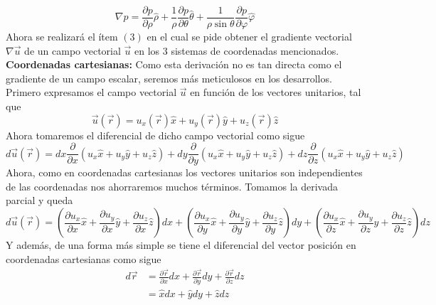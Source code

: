 \documentclass[11pt,letterpaper]{article}
\begin{document}
\begin{equation}
    \nabla p = \frac{\partial p}{\partial \rho}\hat{\rho} + \frac{1}{\rho}\frac{\partial p }{\partial \theta}\hat{\theta}+\frac{1}{\rho\sin{\theta}}\frac{\partial p }{\partial \varphi}\hat{\varphi}
\end{equation}
Ahora se realizará el ítem $(3)$ en el cual se pide obtener el gradiente vectorial $\nabla \vec{u}$ de un campo vectorial $\vec{u}$ en los 3 sistemas de coordenadas mencionados.  \\
\textbf{Coordenadas cartesianas:} Como esta derivación no es tan directa como el gradiente de un campo escalar, seremos más meticulosos en los desarrollos. Primero expresamos el campo vectorial $\vec{u}$ en función de los vectores unitarios, tal que
\begin{equation}
    \vec{u}(\vec{r})=u_x(\vec{r})\hat{x} + u_y(\vec{r})\hat{y}+u_z(\vec{r})\hat{z}
\end{equation}
Ahora tomaremos el diferencial de dicho campo vectorial como sigue
\begin{equation}
     d\vec{u}(\vec{r})=dx\frac{\partial}{\partial x}(u_x\hat{x} + u_y\hat{y}+u_z\hat{z}) + dy\frac{\partial}{\partial y}(u_x\hat{x} + u_y\hat{y}+u_z\hat{z})+dz\frac{\partial}{\partial z}(u_x\hat{x} + u_y\hat{y}+u_z\hat{z})
\end{equation}
Ahora, como en coordenadas cartesianas los vectores unitarios son independientes de las coordenadas nos ahorraremos muchos términos. Tomamos la derivada parcial y queda
\begin{equation}
    d\vec{u}(\vec{r}) = \left(\frac{\partial u_x}{\partial x}\hat{x}+\frac{\partial u_y}{\partial x}\hat{y}+\frac{\partial u_z}{\partial x}\hat{z}\right)dx +\left(\frac{\partial u_x}{\partial y}\hat{x}+\frac{\partial u_y}{\partial y}\hat{y}+\frac{\partial u_z}{\partial y}\hat{z}\right)dy+\left(\frac{\partial u_x}{\partial z}\hat{x}+\frac{\partial u_y}{\partial z}\hat{y}+\frac{\partial u_z}{\partial z}\hat{z}\right)dz
\end{equation}
Y además, de una forma más simple se tiene el diferencial del vector posición en coordenadas cartesianas como sigue
\begin{align*}
    d\vec{r} & =\frac{\partial \vec{r}}{\partial x}dx+\frac{\partial \vec{r}}{\partial y}dy+\frac{\partial \vec{r}}{\partial z}dz \\
    & = \hat{x}dx+\hat{y}dy+\hat{z}dz
\end{align*}
\end{document}
